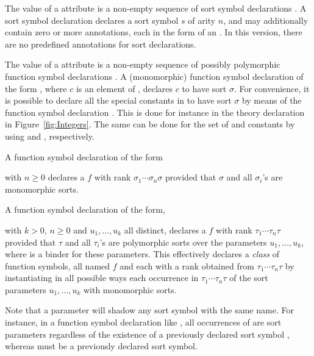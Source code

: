The value of a  attribute is a non-empty sequence
of sort symbol declarations .
A sort symbol declaration  declares 
a sort symbol $s$ of arity $n$, and 
may additionally contain zero or more annotations,
each in the form of an .
In this version, there are no predefined annotations for sort declarations.

The value of a  attribute is a non-empty sequence
of possibly polymorphic function symbol declarations .
A (monomorphic) function symbol declaration 
of the form ,
where $c$ is an element of ,
declares $c$ to have sort $\sigma$.
For convenience,
it is possible to declare all the special constants in  
to have sort $\sigma$ by means of the function symbol declaration
.
This is done for instance in the theory declaration in Figure~\ref{fig:Integers}.
The same can be done for the set of  and  constants
by using  and , respectively. 
 
A function symbol declaration of the form
\begin{center}
\end{center}
with $n \geq 0$ declares a  $f$ with rank 
$\sigma_1\cdots\sigma_n\sigma$
provided that $\sigma$ and all $\sigma_i$'s are monomorphic sorts.

A function symbol declaration of the form,
\begin{center}
\end{center}
with $k > 0$, $n \geq 0$ and $u_1, \ldots, u_k$ all distinct,
declares a  $f$ with rank $\tau_1\cdots\tau_n\tau$
provided that $\tau$ and all $\tau_i$'s are polymorphic sorts over 
the parameters $u_1, \ldots, u_k$, where  is a binder for
these parameters.
This effectively declares a \emph{class} of function symbols, 
all named $f$ and each with a rank obtained from $\tau_1\cdots\tau_n\tau$ 
by instantiating in all possible ways each occurrence in $\tau_1\cdots\tau_n\tau$
of the sort parameters $u_1,\ldots,u_k$ with monomorphic sorts.

Note that a parameter will shadow any sort symbol with the same name.
For instance, in a function symbol declaration like
,
all occurrences of  are sort parameters regardless of the existence
of a previously declared sort symbol , whereas  must
be a previously declared sort symbol.

